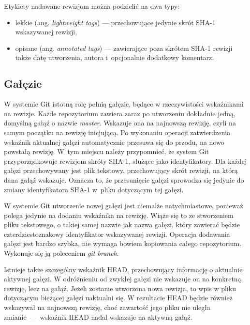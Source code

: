 \documentclass[12pt,a4paper,polish,thesis]{dcsbook}
\begin{document}
	Etykiety nadawane rewizjom można podzielić na dwa typy:
	\begin{itemize}
		\item lekkie (ang. \textit{lightweight tags}) --- przechowujące jedynie skrót SHA-1 wskazywanej rewizji,
		\item opisane (ang. \textit{annotated tags}) --- zawierające poza skrótem SHA-1 rewizji także datę utworzenia, autora i~opcjonalnie dodatkowy komentarz.
	\end{itemize}

	\subsection{Gałęzie} \label{Galezie} \label{HEAD}
	W systemie Git istotną rolę pełnią gałęzie, będące w rzeczywistości wskaźnikami na rewizje.
	Każde repozytorium zawiera zaraz po utworzeniu dokładnie jedną, domyślną gałąź o nazwie \textit{master}. Wskazuje ona na najnowszą rewizję, czyli na samym początku na rewizję inicjującą. Po wykonaniu operacji zatwierdzenia wskaźnik aktualnej gałęzi automatycznie przesuwa się do przodu, na nowo powstałą rewizję. W~tym miejscu należy przypomnieć, że system Git przyporządkowuje rewizjom skróty \mbox{SHA-1}, służące jako identyfikatory. Dla każdej gałęzi przechowywany jest plik tekstowy, przechowujący skrót rewizji, na którą dana gałąź wskazuje. Oznacza to, że przesunięcie gałęzi sprowadza się jedynie do zmiany identyfikatora \mbox{SHA-1} w~pliku dotyczącym tej gałęzi.

	W systemie Git utworzenie nowej gałęzi jest niemalże natychmiastowe, ponieważ polega jedynie na dodaniu wskaźnika na rewizję. Wiąże się to ze stworzeniem pliku tekstowego, o takiej samej nazwie jak nazwa gałęzi, który zawierać będzie czterdziestoznakowy identyfikator wskazywanej rewizji. Operacja dodawania gałęzi jest bardzo szybka, nie wymaga bowiem kopiowania całego repozytorium.
	Wykonuje się ją poleceniem \textit{git branch}.

	Istnieje także szczególny wskaźnik HEAD, przechowujący informację o aktualnie aktywnej gałęzi. W odróżnieniu od zwykłej gałęzi nie wskazuje on na konkretną rewizję, lecz na gałąź. Jeżeli zostanie utworzona nowa rewizja, to wpis w pliku dotyczącym bieżącej gałęzi uaktualni się. W rezultacie HEAD będzie również wskazywał na najnowszą rewizję, choć zawartość jego pliku nie uległa zmianie~---~wskaźnik HEAD nadal wskazuje na aktywną gałąź.
\end{document}
